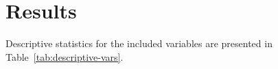 \documentclass[10pt,letterpaper]{article}
\providecommand{\DIFdelbegin}{} %
\newcommand{\DIFscaledelfig}{0.5}
\newlength{\DIFdelgraphicswidth} %
\newlength{\DIFdelgraphicsheight} %
\newcommand{\DIFdelincludegraphics}[2][]{%
\sbox{\DIFdelgraphicsbox}{\DIFOincludegraphics[#1]{#2}}%
\settoboxwidth{\DIFdelgraphicswidth}{\DIFdelgraphicsbox} %
\settoboxtotalheight{\DIFdelgraphicsheight}{\DIFdelgraphicsbox} %
\scalebox{\DIFscaledelfig}{%
\parbox[b]{\DIFdelgraphicswidth}{\usebox{\DIFdelgraphicsbox}\\[-\baselineskip] \rule{\DIFdelgraphicswidth}{0em}}\llap{\resizebox{\DIFdelgraphicswidth}{\DIFdelgraphicsheight}{%
\setlength{\unitlength}{\DIFdelgraphicswidth}%
\begin{picture}(1,1)%
\thicklines\linethickness{2pt} %
{\color[rgb]{1,0,0}\put(0,0){\framebox(1,1){}}}%
{\color[rgb]{1,0,0}\put(0,0){\line( 1,1){1}}}%
{\color[rgb]{1,0,0}\put(0,1){\line(1,-1){1}}}%
\end{picture}%
}\hspace*{3pt}}} %
} %
\DeclareRobustCommand{\DIFdelbegin}{\DIFOdelbegin \let\includegraphics\DIFdelincludegraphics} %
\begin{document}
\section*{Results}\label{results}

Descriptive statistics for the included variables are presented in Table~\ref{tab:descriptive-vars}.

\DIFdelbegin %
\end{document}
